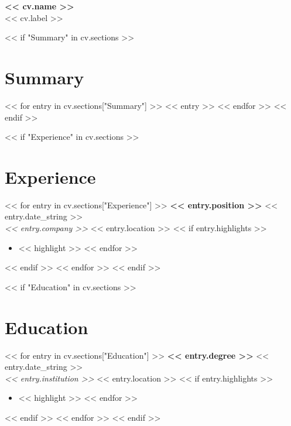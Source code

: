 \documentclass[10pt, letterpaper]{article}
\newcommand{\cvheader}[2]{
    \begin{center}
        {\Huge \bfseries #1} \\ \vspace{0.5em}
        {\large #2}
    \end{center}
}
\begin{document}
\begin{paracol}{2}
\begin{rightcolumn}
    \cvheader{<< cv.name >>}{<< cv.label >>}

    << if "Summary" in cv.sections >>
    \section*{Summary}
    << for entry in cv.sections["Summary"] >>
    << entry >>
    << endfor >>
    << endif >>

    << if "Experience" in cv.sections >>
    \section*{Experience}
    << for entry in cv.sections["Experience"] >>
    \noindent\textbf{<< entry.position >>} \hfill << entry.date_string >> \\
    \textit{<< entry.company >>} \hfill << entry.location >>
    << if entry.highlights >>
    \begin{itemize}
        << for highlight in entry.highlights >>
        \item << highlight >>
        << endfor >>
    \end{itemize}
    << endif >>
    \vspace{1em}
    << endfor >>
    << endif >>

    << if "Education" in cv.sections >>
    \section*{Education}
    << for entry in cv.sections["Education"] >>
    \noindent\textbf{<< entry.degree >>} \hfill << entry.date_string >> \\
    \textit{<< entry.institution >>} \hfill << entry.location >>
    << if entry.highlights >>
    \begin{itemize}
        << for highlight in entry.highlights >>
        \item << highlight >>
        << endfor >>
    \end{itemize}
    << endif >>
    \vspace{1em}
    << endfor >>
    << endif >>

\end{rightcolumn}
\end{paracol}
\end{document}
